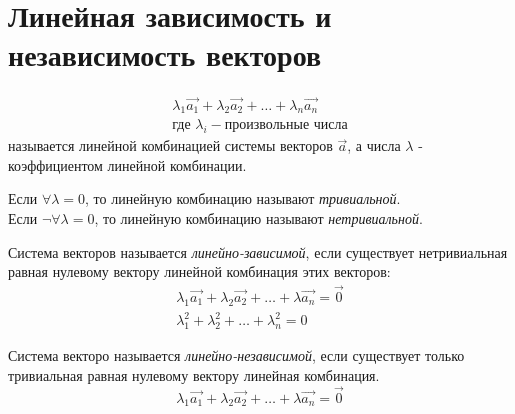 \section{Линейная зависимость и независимость векторов}

\begin{definition}
  \begin{gather*}
    \lambda_1 \vec{a_1} + \lambda_2 \vec{a_2} + \ldots + \lambda_n \vec{a_n} \\
    \text{где } \lambda_i - \text{произвольные числа}
  \end{gather*}
  называется линейной комбинацией системы векторов $\vec{a}$, а числа $\lambda$ - коэффициентом линейной комбинации.  \\
\end{definition}

Если $\forall \lambda = 0$, то линейную комбинацию называют \textit{тривиальной}. \\
Если $\neg \forall \lambda = 0$, то линейную комбинацию называют \textit{нетривиальной}. 

\begin{definition}
Система векторов называется \textit{линейно-зависимой}, если существует нетривиальная равная нулевому вектору линейной комбинация этих векторов:
  \begin{gather*}
    \lambda_1 \vec{a_1} + \lambda_2 \vec{a_2} + \ldots + \lambda \vec{a_n} = \vec{0} \\
    \lambda_1^2 + \lambda_2^2 + \ldots + \lambda_n^2 = 0
  \end{gather*}
\end{definition}

\begin{definition}
  Система векторо называется \textit{линейно-независимой}, если существует только тривиальная равная нулевому вектору линейная комбинация.
  \[
    \lambda_1 \vec{a_1} + \lambda_2 \vec{a_2} + \ldots + \lambda \vec{a_n} = \vec{0}
  \] 
\end{definition}

